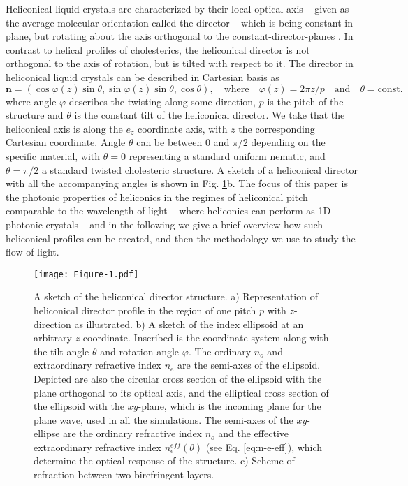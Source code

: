 \documentclass{osa-article}
\renewcommand{\vec}[1]{\mathbf{#1}}
\begin{document}
Heliconical liquid crystals are characterized by their local optical axis -- given as the average molecular orientation called the director -- 
which is being constant in plane, but rotating about the axis orthogonal to the constant-director-planes \cite{ChenD_ProcNatlAcadSci110_2013}.
In contrast to helical profiles of cholesterics, the heliconical director is not orthogonal to the axis of rotation, but is tilted with respect to it. 
The director in heliconical liquid crystals can be described in Cartesian basis as 
\begin{equation}
\vec{n}=(\cos \varphi(z)  \sin \theta, \sin \varphi (z) \sin \theta, \cos \theta), \quad \mathrm{where} \quad \varphi(z) = 2 \pi z/ p \quad \mathrm{and} \quad \theta=\mathrm{const.} 
\label{eq:n}
\end{equation}
where angle $\varphi$ describes the twisting along some direction, $p$ is the pitch of the structure and $\theta$ is the constant tilt of the heliconical director. 
We take that the heliconical axis is along the $e_z$ coordinate axis, with $z$ the corresponding Cartesian coordinate. 
Angle $\theta$ can be between $0$ and $\pi/2$ depending on the specific material, with $\theta=0$ representing a standard uniform nematic, 
and $\theta=\pi/2$ a standard twisted cholesteric structure. 
A sketch of a heliconical director with all the accompanying angles is shown in Fig. \ref{fig:sketch}b. 
The focus of this paper is the photonic properties of heliconics in the regimes of heliconical pitch comparable to the wavelength of light 
-- where heliconics can perform as 1D photonic crystals --
and in the following we give a brief overview how such heliconical profiles can be created, and then the methodology we use to study the flow-of-light.

\begin{figure}[h!]
  \centering
  \texttt{[image: Figure-1.pdf]}
  \caption{A sketch of the heliconical director structure. 
  a) Representation of heliconical director profile in the region of one pitch $p$ with $z$-direction as illustrated.
  b) A sketch of the index ellipsoid at an arbitrary $z$ coordinate. 
  Inscribed is the coordinate system along with the tilt angle $\theta$ and rotation angle $\varphi$. 
  The ordinary $n_o$ and extraordinary refractive index $n_e$ are the semi-axes of the ellipsoid. 
  Depicted are also the circular cross section of the ellipsoid with the plane orthogonal to its optical axis, 
  and the elliptical cross section of the ellipsoid with the $xy$-plane, which is the incoming plane for the plane wave, used in all the simulations. 
  The semi-axes of the $xy$-ellipse are the ordinary refractive index $n_o$ and the effective extraordinary refractive index $n_e^{eff}(\theta)$ (see Eq. \ref{eq:n-e-eff}),
  which determine the optical response of the structure.
  c) Scheme of refraction between two birefringent layers. 
  }
  \label{fig:sketch}
\end{figure}
\end{document}
